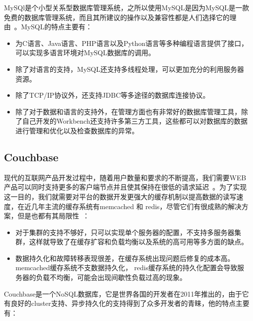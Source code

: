 MySQl是个小型关系型数据库管理系统，之所以使用MySQL是因为MySQL是一款免费的数据库管理系统，而且其所建议的操作以及兼容性都是人们选择它的理由~\cite{greenspan2001mysql}。MySQL的特点主要有\cite{王川2009农业机械装备信息管理系统的设计和研究}：

\begin{itemize}

\item 为C语言、Java语言、PHP语言以及Python语言等多种编程语言提供了接口，可以实现多语言环境对MySQL数据库的调用。

\item 除了对语言的支持，MySQL还支持多线程处理，可以更加充分的利用服务器资源。

\item 除了TCP/IP协议外，还支持JDBC等多途径的数据库连接协议。

\item 除了对于数据和语言的支持外，在管理方面也有非常好的数据库管理工具，除了自己开发的Workbench还支持许多第三方工具，这些都可以对数据库的数据进行管理和优化以及检查数据库的异常。

\end{itemize}

\subsection{Couchbase}

现代的互联网产品开发过程中，随着用户数量和要求的不断提高，我们需要WEB产品可以同时支持更多的客户端节点并且使其保持在很低的请求延迟~\cite{brown2012getting}。为了实现这一目的，我们就需要对平台的数据开发更强大的缓存机制以提高数据的读写速度，在近几年主流的缓存系统有memcached 和 redis，尽管它们有很成熟的解决方案，但是也都有其局限性~\cite{kovacs2013cassandra}：

\begin{itemize}

\item 对于集群的支持不够好，只可以实现单个服务器的配置，不支持多服务器集群，这样就导致了在缓存扩容和负载均衡以及系统的高可用等多方面的缺点。

\item 数据持久化和故障转移表现很差，在缓存系统出现问题后修复的成本高。memcached缓存系统不支数据持久化， redis缓存系统的持久化配置会导致服务器的负载不均衡，可能会出现间歇性负载过高的现象。

\end{itemize}

Couchbase是一个NoSQL数据库，它是世界各国的开发者在2011年推出的，由于它有良好的cluster支持、异步持久化的支持得到了众多开发者的青睐，他的特点主要有：

